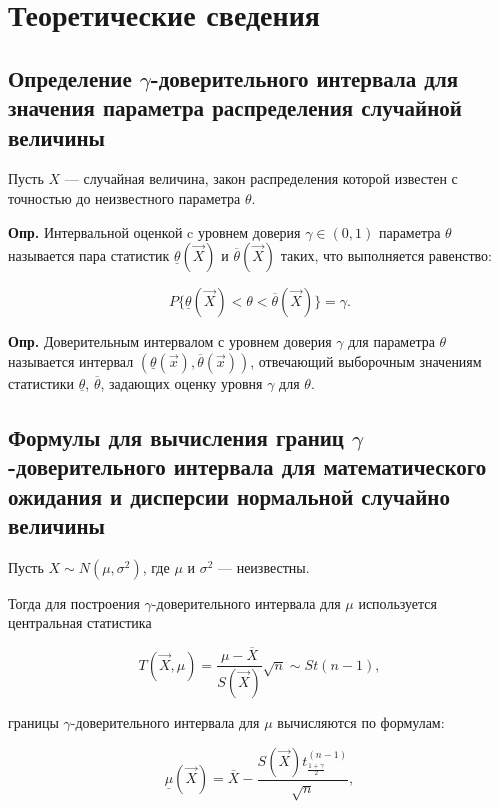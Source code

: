 \chapter{Теоретические сведения}

\section{Определение $\gamma$-доверительного интервала для значения параметра распределения случайной величины}

Пусть $X$ --- случайная величина, закон распределения которой известен с
точностью до неизвестного параметра $\theta$.

\textbf{Опр.} Интервальной оценкой c уровнем доверия $\gamma \in (0, 1)$ параметра $\theta$ называется пара статистик $\underline \theta (\vec X)$ и $\overline \theta (\vec X)$ таких, что выполняется равенство:

\begin{equation}
	\label{eq:P_interv}
	 P\{ \underline \theta (\vec X) < \theta  < \overline \theta (\vec X)\} = \gamma.
\end{equation}

\textbf{Опр.} Доверительным интервалом с уровнем доверия $\gamma$ для параметра $\theta$ называется интервал $(\underline \theta (\vec x), \overline \theta (\vec x))$, отвечающий выборочным значениям статистики $\underline \theta$, $\overline \theta$, задающих оценку уровня $\gamma$ для $\theta$.

\section{Формулы для вычисления границ $\gamma$-доверительного интервала для математического ожидания и дисперсии нормальной случайно величины}

Пусть $X \sim N(\mu, \sigma^2)$, где $\mu$ и $\sigma^2$ --- неизвестны.

Тогда для построения $\gamma$-доверительного интервала для $\mu$ используется
центральная статистика

\begin{equation}
	\label{eq:T_1}
	T(\vec X, \mu) = \frac{\mu - \overline X}{S(\vec X)} \sqrt n \sim St(n - 1),
\end{equation}

 границы $\gamma$-доверительного интервала для $\mu$ вычисляются по
формулам:

\begin{equation}
	\label{eq:mu_lower}
	\underline \mu (\vec X) = \overline X - \frac{S(\vec X)t^{(n-1)}_{\frac{1 +
				\gamma}{2}}}{\sqrt n},
\end{equation}

